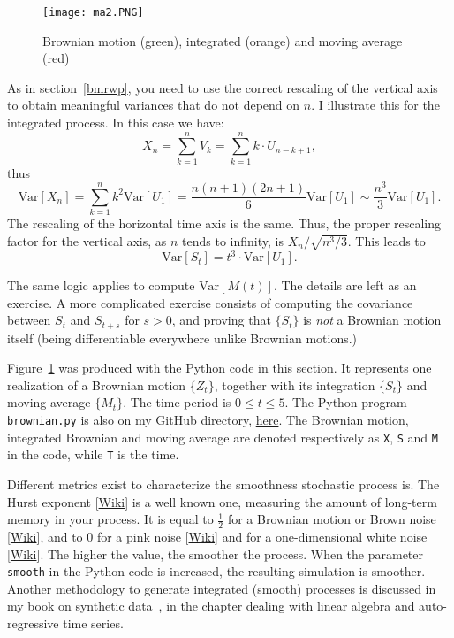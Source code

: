 \documentclass[oneside,10pt]{book}
\begin{document}
\begin{figure}[H]
\centering
\texttt{[image: ma2.PNG]} %
\caption{Brownian motion (green), integrated (orange) and moving average (red)}
\label{fig:trc}
\end{figure}

As in section~\ref{bmrwp}, you need to use the correct rescaling of the vertical axis to obtain meaningful variances that do not depend on $n$.
 I illustrate this for the integrated process. In this case we have:
$$
X_n = \sum_{k=1}^n V_k =\sum_{k=1}^n k\cdot U_{n-k+1},
$$
thus
$$
\text{Var}[X_n] = \sum_{k=1}^n k^2 \text{Var}[U_1] =\frac{n(n+1)(2n+1)}{6}\text{Var}[U_1]\sim \frac{n^3}{3}\text{Var}[U_1].
$$
The rescaling of the horizontal time axis is the same. Thus, the proper rescaling factor for the vertical axis, as $n$ tends to infinity, is
$X_n / \sqrt{n^3/3}$. This leads to
\begin{equation}
\text{Var}[S_t] = t^3 \cdot \text{Var}[U_1].\label{eq2}
\end{equation}

The same logic applies to compute $\text{Var}[M(t)]$. The details are left as an exercise. A more complicated exercise consists of computing the covariance between $S_t$ and $S_{t + s}$ for $s > 0$, and proving that $\{S_t\}$ is {\em not} a Brownian motion itself (being differentiable everywhere unlike Brownian motions.)

Figure~\ref{fig:trc} was produced with the Python code in this section. It represents one realization of a Brownian motion $\{Z_t\}$, together with its integration $\{S_t\}$ and moving average $\{M_t\}$. The time period is $0\leq t \leq 5$. The Python program \texttt{brownian.py} is also on my
GitHub directory, \href{https://github.com/VincentGranville/Stochastic-Processes/blob/master/Brownian.py}{here}.
The Brownian motion, integrated Brownian and moving average are denoted respectively as \texttt{X}, \texttt{S} and \texttt{M} in the code,
 while \texttt{T} is the time.

Different metrics exist to characterize the smoothness stochastic process is. The
\textcolor{index}{Hurst exponent} [\href{https://en.wikipedia.org/wiki/Hurst_exponent}{Wiki}] is a well known one, measuring the amount of long-term memory in your process. It is equal to $\frac{1}{2}$ for a Brownian motion or
 \textcolor{index}{Brown noise} [\href{https://en.wikipedia.org/wiki/Brownian_noise}{Wiki}], and to 0
 for a \textcolor{index}{pink noise} [\href{https://en.wikipedia.org/wiki/Pink_noise}{Wiki}] and for a
one-dimensional \textcolor{index}{white noise} [\href{https://en.wikipedia.org/wiki/White_noise}{Wiki}]. The higher the value, the smoother the process.  When the parameter \texttt{smooth} in the Python code is increased,
 the resulting simulation is smoother.  Another methodology to generate integrated (smooth) processes is discussed in my book on synthetic data~\cite{vgsynthetic}, in the chapter dealing with linear algebra and auto-regressive time series.
\end{document}

